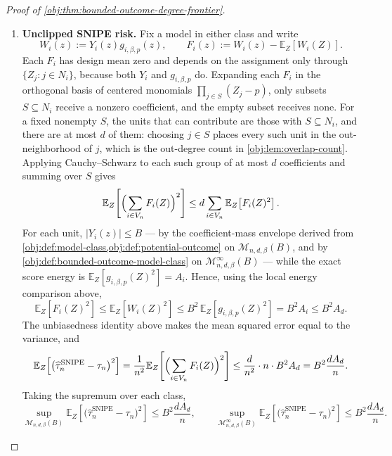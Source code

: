 \begin{proof}[Proof of \cref{obj:thm:bounded-outcome-degree-frontier}]
\begin{enumerate}
\item \textbf{Unclipped SNIPE risk.}
Fix a model in either class and write
\[
W_i(z):=Y_i(z)g_{i,\beta,p}(z),
\qquad
F_i(z):=W_i(z)-\mathbb E_Z[W_i(Z)] .
\]
Each \(F_i\) has design mean zero and depends on the assignment only through
\(\{Z_j:j\in N_i\}\), because both \(Y_i\) and \(g_{i,\beta,p}\) do.  Expanding
each \(F_i\) in the orthogonal basis of centered monomials
\(\prod_{j\in S}(Z_j-p)\), only subsets \(S\subseteq N_i\) receive a nonzero
coefficient, and the empty subset receives none.  For a fixed nonempty \(S\), the
units that can contribute are those with \(S\subseteq N_i\), and there are at
most \(d\) of them: choosing \(j\in S\) places every such unit in the
out-neighborhood of \(j\), which is the out-degree count in
\cref{obj:lem:overlap-count}.  Applying Cauchy--Schwarz to each such group of at
most \(d\) coefficients and summing over \(S\) gives
\[
\mathbb E_Z\!\left[\Bigl(\sum_{i\in V_n}F_i(Z)\Bigr)^2\right]
\le
d\sum_{i\in V_n}\mathbb E_Z\!\left[F_i(Z)^2\right].
\]
For each unit, \(|Y_i(z)|\le B\) — by the coefficient-mass envelope derived from
\cref{obj:def:model-class,obj:def:potential-outcome} on
\(\mathcal M_{n,d,\beta}(B)\), and by
\cref{obj:def:bounded-outcome-model-class} on
\(\mathcal M_{n,d,\beta}^{\infty}(B)\) — while the exact score energy is
\(\mathbb E_Z[g_{i,\beta,p}(Z)^2]=A_i\).  Hence, using the local energy comparison above,
\[
\mathbb E_Z\!\left[F_i(Z)^2\right]
\le
\mathbb E_Z\!\left[W_i(Z)^2\right]
\le
B^2\,\mathbb E_Z\!\left[g_{i,\beta,p}(Z)^2\right]
=B^2A_i
\le B^2A_d .
\]
The unbiasedness identity above makes the mean squared error equal to the
variance, and
\[
\mathbb E_Z\!\left[
\bigl(\widehat\tau_n^{\mathrm{SNIPE}}-\tau_n\bigr)^2
\right]
=
\frac{1}{n^{2}}
\mathbb E_Z\!\left[\Bigl(\sum_{i\in V_n}F_i(Z)\Bigr)^2\right]
\le
\frac{d}{n^{2}}\cdot n\cdot B^2A_d
=
B^2\frac{dA_d}{n}.
\]
Taking the supremum over each class,
\[
\sup_{\mathcal M_{n,d,\beta}(B)}
\mathbb E_Z\!\left[
\bigl(\widehat\tau_n^{\mathrm{SNIPE}}-\tau_n\bigr)^2
\right]
\le
B^2\frac{dA_d}{n},
\qquad
\sup_{\mathcal M_{n,d,\beta}^{\infty}(B)}
\mathbb E_Z\!\left[
\bigl(\widehat\tau_n^{\mathrm{SNIPE}}-\tau_n\bigr)^2
\right]
\le
B^2\frac{dA_d}{n}.
\]


\end{enumerate}
\end{proof}
